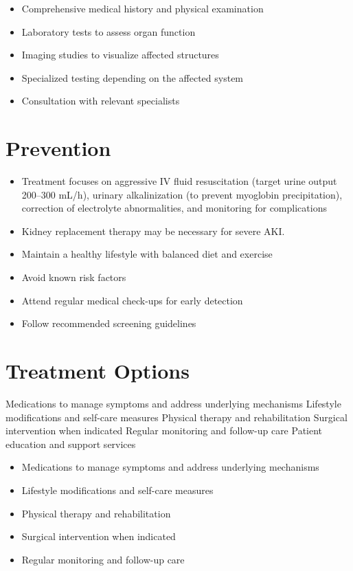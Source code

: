 \begin{itemize}[noitemsep]
  \item Comprehensive medical history and physical examination
  \item Laboratory tests to assess organ function
  \item Imaging studies to visualize affected structures
  \item Specialized testing depending on the affected system
  \item Consultation with relevant specialists
\end{itemize}
\section{Prevention}
\begin{itemize}[noitemsep]
  \item Treatment focuses on aggressive IV fluid resuscitation (target urine output 200--300 mL/h), urinary alkalinization (to prevent myoglobin precipitation), correction of electrolyte abnormalities, and monitoring for complications
  \item Kidney replacement therapy may be necessary for severe AKI.
  \item Maintain a healthy lifestyle with balanced diet and exercise
  \item Avoid known risk factors
  \item Attend regular medical check-ups for early detection
  \item Follow recommended screening guidelines
\end{itemize}
\section{Treatment Options}
Medications to manage symptoms and address underlying mechanisms Lifestyle modifications and self-care measures Physical therapy and rehabilitation Surgical intervention when indicated Regular monitoring and follow-up care Patient education and support services

\begin{itemize}[noitemsep]
  \item Medications to manage symptoms and address underlying mechanisms
  \item Lifestyle modifications and self-care measures
  \item Physical therapy and rehabilitation
  \item Surgical intervention when indicated
  \item Regular monitoring and follow-up care
\end{itemize}
